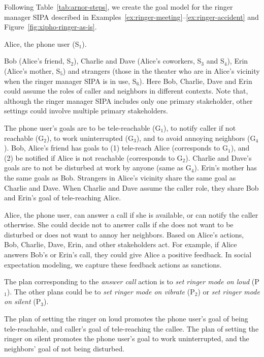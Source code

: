 \documentclass[11pt,          %
               phd,           %
               onehalfspacing %
               ]{ncsuthesis}
\newcommand{\fsl}{\textsl}
\begin{document}
Following Table~\ref{tab:arnor-steps}, we create the goal
model for the ringer manager SIPA described in Examples~\ref{ex:ringer-meeting}--\ref{ex:ringer-accident} and Figure~\ref{fig:xipho-ringer-as-is}.

\begin{description}[leftmargin=1em]
  
  \item[Primary stakeholder.] Alice, the phone user (S$_1$). 

\item[Secondary stakeholders.] Bob (Alice's friend, S$_2$), Charlie and
Dave (Alice's coworkers, S$_3$ and S$_4$), Erin (Alice's mother, S$_5$)
and strangers (those in the theater who are in Alice's vicinity when
the ringer manager SIPA is in use, S$_6$). Here Bob, Charlie, Dave and Erin
could assume the roles of caller and neighbors in different contexts.
Note that, although the ringer manager SIPA includes only one primary
stakeholder, other settings could involve multiple primary stakeholders.

\item[Goals.] The phone user's goals are to be
tele-reachable (G$_1$), to notify caller if not reachable (G$_2$), to
work uninterrupted (G$_3$), and to avoid annoying
neighbors (G$_4$). Bob, Alice's friend has goals to (1) tele-reach Alice
(corresponds to G$_1$), and (2) be notified if Alice is not reachable
(corresponds to G$_2$). Charlie and Dave's goals are to not be disturbed
at work by anyone (same as G$_4$). Erin's mother has the same goals as
Bob. Strangers in Alice's vicinity share the same goal as Charlie and
Dave. When Charlie and Dave assume the caller role, they share Bob and 
Erin's goal of tele-reaching Alice.
  
\item[Actions.] Alice, the phone user, can answer a call if she is
available, or can notify the caller otherwise. She could
decide not to answer calls if she does not want to be disturbed or does
not want to annoy her neighbors. Based on Alice's actions, Bob, Charlie,
Dave, Erin, and other stakeholders act. For example, if Alice answers
Bob's or Erin's call, they could give Alice a positive feedback. In social
expectation modeling, we capture these feedback actions as sanctions. 

\item[Plans.] The plan corresponding to the \fsl{answer call} action is to
\fsl{set ringer mode on loud} (P$_1$). The other plans could be to
\fsl{set ringer mode on vibrate} (P$_2$) or \fsl{set ringer mode on
silent} (P$_3$).

\item[Goal-plan association.] The plan of setting the ringer on
loud promotes the phone user's goal of being tele-reachable, and
caller's goal of tele-reaching the callee. The plan of setting the
ringer on silent promotes the phone user's goal to work
uninterrupted, and the neighbors' goal of not being disturbed.
\end{description}
\end{document}
